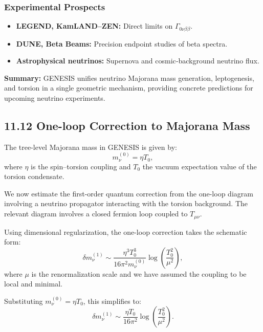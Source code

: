 \documentclass{article}
\begin{document}
\subsubsection{ Experimental Prospects}
\begin{itemize}
  \item \textbf{LEGEND, KamLAND–ZEN:} Direct limits on \(\Gamma_{0\nu\beta\beta}\).  
  \item \textbf{DUNE, Beta Beams:} Precision endpoint studies of beta spectra.  
  \item \textbf{Astrophysical neutrinos:} Supernova and cosmic‐background neutrino flux.
\end{itemize}

\noindent\textbf{Summary:}  
GENESIS unifies neutrino Majorana mass generation, leptogenesis, and torsion
in a single geometric mechanism, providing concrete predictions for upcoming
neutrino experiments.



\subsection*{11.12 One-loop Correction to Majorana Mass}

The tree-level Majorana mass in GENESIS is given by:
\begin{equation}
m_\nu^{(0)} = \eta T_0,
\end{equation}
where $\eta$ is the spin–torsion coupling and $T_0$ the vacuum expectation value of the torsion condensate.

We now estimate the first-order quantum correction from the one-loop diagram involving a neutrino propagator interacting with the torsion background. The relevant diagram involves a closed fermion loop coupled to $T_{\mu\nu}$.

Using dimensional regularization, the one-loop correction takes the schematic form:
\begin{equation}
\delta m_\nu^{(1)} \sim \frac{\eta^3 T_0^3}{16\pi^2 m_\nu^{(0)}} \log \left( \frac{T_0^2}{\mu^2} \right),
\end{equation}
where $\mu$ is the renormalization scale and we have assumed the coupling to be local and minimal.

Substituting $m_\nu^{(0)} = \eta T_0$, this simplifies to:
\begin{equation}
\delta m_\nu^{(1)} \sim \frac{\eta T_0}{16\pi^2} \log \left( \frac{T_0^2}{\mu^2} \right).
\end{equation}
\end{document}
